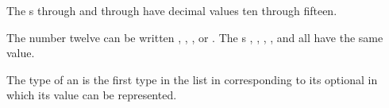 \pnum
The s
 through  and  through 
have decimal values ten through fifteen.
\begin{example}
The number twelve can be written , ,
, or . The s ,
, , , and
 all have the same value.
\end{example}

\pnum
{}%
%
%
%
%
%
%
%
The type of an  is
the first type in the list in 
corresponding to its optional 
in which its value can be represented.

